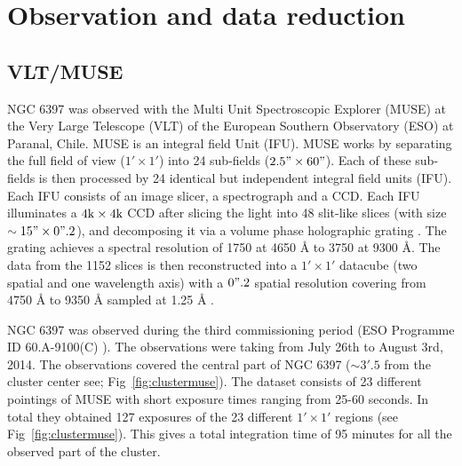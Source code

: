 \chapter{Observation and data reduction}\label{chap:data}
\thispagestyle{fancy}

\section{VLT/MUSE}

NGC 6397 was observed with the Multi Unit Spectroscopic Explorer (MUSE) at the Very Large Telescope (VLT) of the European Southern Observatory (ESO) at Paranal, Chile. MUSE is an integral field Unit (IFU). MUSE works by separating the full field of view ($1' \times 1'$) into 24 sub-fields ($2.5" \times 60"$). Each of these sub-fields is then processed by 24 identical but independent integral field units (IFU). Each IFU consists of an image slicer, a spectrograph and a CCD. Each IFU illuminates a $4 \text k \times 4 \text k$ CCD after slicing the light into 48 slit-like slices (with size $\sim 15" \times 0".2$), and decomposing it via a volume phase holographic grating \citep{barden_volume-phase_1998}. The grating achieves a spectral resolution of 1750 at 4650 Å to 3750 at 9300 Å. The data from the 1152 slices is then reconstructed into a $1' \times 1'$ datacube (two spatial and one wavelength axis) with a $0".2$ spatial resolution covering from 4750 Å to 9350 Å sampled at 1.25 Å \citep{bacon_muse_2010}. 

NGC 6397 was observed during the third commissioning period  (ESO Programme ID 60.A-9100(C) \citealp{bacon_muse_2014}). The observations were taking from July 26th to August 3rd, 2014. The observations covered the central part of NGC 6397 ($\sim 3'.5$ from the cluster center see; Fig~\ref{fig:clustermuse}). The dataset consists of 23 different pointings of MUSE with short exposure times ranging from 25-60 seconds. In total they obtained 127 exposures of the 23 different $1' \times 1'$ regions (see Fig~\ref{fig:clustermuse}). This gives a total integration time of 95 minutes for all the observed part of the cluster.


